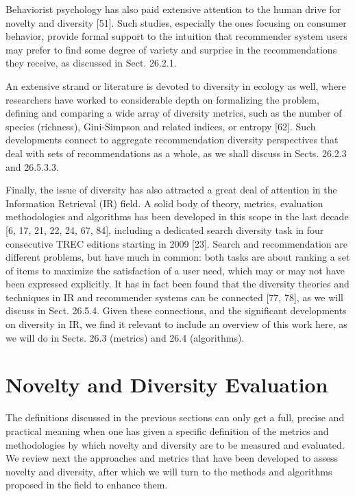Behaviorist psychology has also paid extensive attention to the human drive for novelty and diversity [51]. Such studies, especially the ones focusing on consumer behavior, provide formal support to the intuition that recommender system users may prefer to find some degree of variety and surprise in the recommendations they receive, as discussed in Sect. 26.2.1.

An extensive strand or literature is devoted to diversity in ecology as well, where researchers have worked to considerable depth on formalizing the problem, defining and comparing a wide array of diversity metrics, such as the number of species (richness), Gini-Simpson and related indices, or entropy [62]. Such developments connect to aggregate recommendation diversity perspectives that deal with sets of recommendations as a whole, as we shall discuss in Sects. 26.2.3 and 26.5.3.3.

Finally, the issue of diversity has also attracted a great deal of attention in the Information Retrieval (IR) field. A solid body of theory, metrics, evaluation methodologies and algorithms has been developed in this scope in the last decade [6, 17, 21, 22, 24, 67, 84], including a dedicated search diversity task in four consecutive TREC editions starting in 2009 [23]. Search and recommendation are different problems, but have much in common: both tasks are about ranking a set of items to maximize the satisfaction of a user need, which may or may not have been expressed explicitly. It has in fact been found that the diversity theories and techniques in IR and recommender systems can be connected [77, 78], as we will discuss in Sect. 26.5.4. Given these connections, and the significant developments on diversity in IR, we find it relevant to include an overview of this work here, as we will do in Sects. 26.3 (metrics) and 26.4 (algorithms).

\section{Novelty and Diversity Evaluation}

The definitions discussed in the previous sections can only get a full, precise and practical meaning when one has given a specific definition of the metrics and methodologies by which novelty and diversity are to be measured and evaluated. We review next the approaches and metrics that have been developed to assess novelty and diversity, after which we will turn to the methods and algorithms proposed in the field to enhance them.

